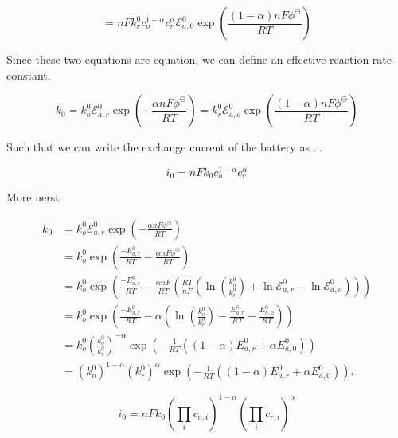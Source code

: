 \documentclass[lettersize,journal]{IEEEtran}
\begin{document}
\begin{equation}
=n F k_{r}^{0} c_{o}^{1-\alpha} c_{r}^{\alpha} \mathscr{E}_{a, 0}^{0} \exp \left(\frac{(1-\alpha) n F \phi^{\ominus}}{R T}\right)
\end{equation}

\noindent Since these two equations are equation, we can define an effective reaction rate constant.

\begin{equation}
k_{0}=k_{o}^{0} \mathscr{E}_{a, r}^{0} \exp \left(-\frac{\alpha n F \phi^{\ominus}}{R T}\right)=k_{r}^{0} \mathscr{E}_{a, o}^{0} \exp \left(\frac{(1-\alpha) n F \phi^{\ominus}}{R T}\right)
\end{equation}

\noindent Such that we can write the exchange current of the battery as ...

\begin{equation}
i_{0}=n F k_{0} c_{o}^{1-\alpha} c_{r}^{\alpha}
\end{equation}

\noindent More nerst

\begin{equation}
\begin{aligned}
k_{0} &=k_{o}^{0} \mathscr{E}_{a, r}^{0} \exp \left(-\frac{\alpha n F \phi^{\ominus}}{R T}\right) \\
&=k_{o}^{0} \exp \left(\frac{-E_{a, r}^{0}}{R T}-\frac{\alpha n F \phi^{\ominus}}{R T}\right) \\
&=k_{o}^{0} \exp \left(\frac{-E_{a, r}^{0}}{R T}-\frac{\alpha n F}{R T}\left(\frac{R T}{n F}\left(\ln \left(\frac{k_{o}^{0}}{k_{r}^{0}}\right)+\ln \mathscr{E}_{a, r}^{0}-\ln \mathscr{E}_{a, o}^{0}\right)\right)\right) \\
&=k_{o}^{0} \exp \left(\frac{-E_{a, r}^{0}}{R T}-\alpha\left(\ln \left(\frac{k_{o}^{0}}{k_{r}^{0}}\right)-\frac{E_{a, r}^{0}}{R T}+\frac{E_{a, 0}^{0}}{R T}\right)\right) \\
&=k_{o}^{0}\left(\frac{k_{o}^{0}}{k_{r}^{0}}\right)^{-\alpha} \exp \left(-\frac{1}{R T}\left((1-\alpha) E_{a, r}^{0}+\alpha E_{a, 0}^{0}\right)\right) \\
&=\left(k_{o}^{0}\right)^{1-\alpha}\left(k_{r}^{0}\right)^{\alpha} \exp \left(-\frac{1}{R T}\left((1-\alpha) E_{a, r}^{0}+\alpha E_{a, 0}^{0}\right)\right) .
\end{aligned}
\end{equation}


\begin{equation}
i_{0}=n F k_{0}\left(\prod_{i} c_{o, i}\right)^{1-\alpha}\left(\prod_{i} c_{r, i}\right)^{\alpha}
\end{equation}
\end{document}
